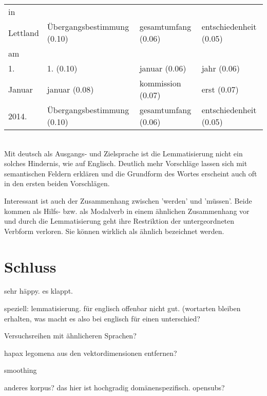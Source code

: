 \documentclass[11pt,twoside,openright]{mpreport}
\begin{document}
\begin{footnotesize}
\begin{tabular}{|llll|}
in & & & \\
Lettland                & Übergangsbestimmung (0.10) & gesamtumfang (0.06) & entschiedenheit (0.05) \\
am & & & \\
1.                      & 1. (0.10) & januar (0.06) & jahr (0.06) \\
Januar                  & januar (0.08) & kommission (0.07) & erst (0.07) \\
2014.                   & Übergangsbestimmung (0.10) & gesamtumfang (0.06) & entschiedenheit (0.05) \\
\hline
\end{tabular}\end{footnotesize}\\

Mit deutsch als Ausgangs- und Zielsprache ist die Lemmatisierung nicht ein solches Hindernis, wie auf Englisch. Deutlich mehr Vorschläge lassen sich mit semantischen Feldern erklären und die Grundform des Wortes erscheint auch oft in den ersten beiden Vorschlägen.

Interessant ist auch der Zusammenhang zwischen 'werden' und 'müssen'. Beide kommen als Hilfs- bzw. als Modalverb in einem ähnlichen Zusammenhang vor und durch die Lemmatisierung geht ihre Restriktion der untergeordneten Verbform verloren. Sie können wirklich als ähnlich bezeichnet werden.

\chapter{Schluss}
\label{cha:schluss}

sehr häppy. es klappt. 

speziell: lemmatisierung. für englisch offenbar nicht gut. (wortarten bleiben erhalten, was macht es also bei englisch für einen unterschied?



Versuchsreihen mit ähnlicheren Sprachen?

hapax legomena aus den vektordimensionen entfernen?

smoothing

anderes korpus? das hier ist hochgradig domänenspezifisch. opensubs?


\listoffigures
{}
\end{document}

